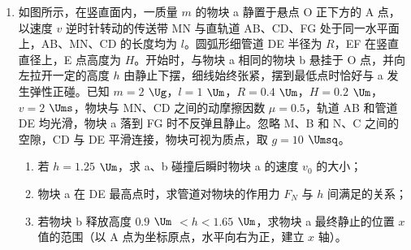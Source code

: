 \documentclass[\gkver]{gaokaozhenti}
\begin{document}
\begin{enumerate}
{	$-2a_{2}l_{2}=v_{\max}^{2}-v^{2}$

	代入数据联立解得

	$l_{2}=2.7$ $\Um$
}

\item
如图所示，在竖直面内，一质量 $m$ 的物块 a 静置于悬点 O 正下方的 A 点，以速度 $v$ 逆时针转动的传送带 MN 与直轨道 AB、CD、FG 处于同一水平面上，AB、MN、CD 的长度均为 $l$。圆弧形细管道 DE 半径为 $R$，EF 在竖直直径上，E 点高度为 $H$。开始时，与物块 a 相同的物块 b 悬挂于 O 点，并向左拉开一定的高度 $h$ 由静止下摆，细线始终张紧，摆到最低点时恰好与 a 发生弹性正碰。已知 $m = 2$ $\Ug$，$l = 1$ $\Um$，$R = 0.4$ $\Um$，$H = 0.2$ $\Um$，$v = 2$ $\Ums$，物块与 MN、CD 之间的动摩擦因数 $\mu = 0.5$，轨道 AB 和管道 DE 均光滑，物块 a 落到 FG 时不反弹且静止。忽略 M、B 和 N、C 之间的空隙，CD 与 DE 平滑连接，物块可视为质点，取 $g = 10$ $\Umsq$。
\begin{enumerate}
	\item
	若 $h = 1.25$ $\Um$，求 a、b 碰撞后瞬时物块 a 的速度 $v_{0}$ 的大小；
	\item
	物块 a 在 DE 最高点时，求管道对物块的作用力 $F_{N}$ 与 $h$ 间满足的关系；
	\item
	若物块 b 释放高度 $0.9$ $\Um$ $< h < 1.65$ $\Um$，求物块 a 最终静止的位置 $x$ 值的范围（以 A 点为坐标原点，水平向右为正，建立 $x$ 轴）。
\end{enumerate}

\end{enumerate}
\end{document}
